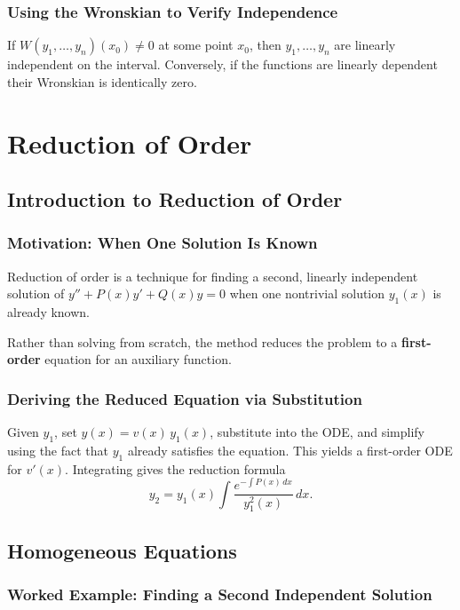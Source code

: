 \documentclass[10pt]{article}
\newcommand{\m}[1]{$#1$}
\begin{document}
    \subsubsection{Using the Wronskian to Verify Independence}
    If \m{W(y_1, \ldots, y_n)(x_0) \neq 0} at some point \m{x_0}, then \m{y_1, \ldots, y_n} are
    linearly independent on the interval. Conversely, if the functions are linearly dependent their
    Wronskian is identically zero.

\section{Reduction of Order}

\subsection{Introduction to Reduction of Order}

    \subsubsection{Motivation: When One Solution Is Known}
    Reduction of order is a technique for finding a second, linearly independent solution of
    \m{y'' + P(x)y' + Q(x)y = 0} when one nontrivial solution \m{y_1(x)} is already known.

    Rather than solving from scratch, the method reduces the problem to a \textbf{first-order} equation
    for an auxiliary function.

    \subsubsection{Deriving the Reduced Equation via Substitution}
    Given \m{y_1}, set \m{y(x) = v(x)\,y_1(x)}, substitute into the ODE, and simplify using the fact
    that \m{y_1} already satisfies the equation. This yields a first-order ODE for \m{v'(x)}.
    Integrating gives the reduction formula
    \[
        y_2 = y_1(x) \int \frac{e^{-\int P(x)\,dx}}{y_1^2(x)}\,dx.
    \]

\subsection{Homogeneous Equations}

    \subsubsection{Worked Example: Finding a Second Independent Solution}
\end{document}
